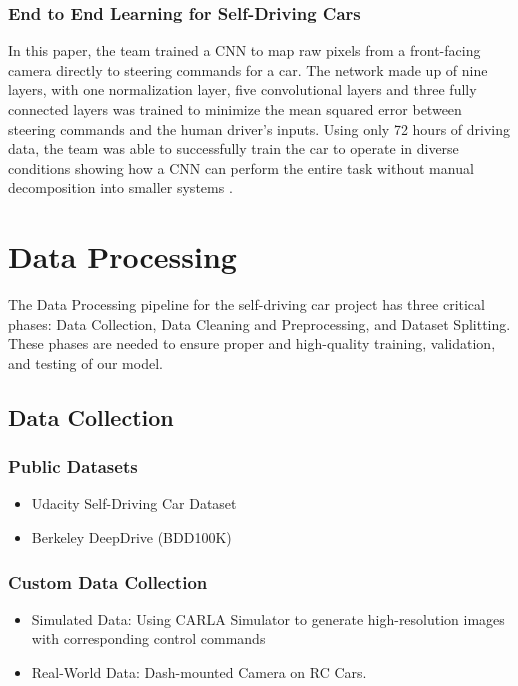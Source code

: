 \documentclass{article} %
\begin{document}
\subsubsection{End to End Learning for Self-Driving Cars \citep{bojarski2016endendlearningselfdriving}}

In this paper, the team trained a CNN to map raw pixels from a front-facing camera directly to steering commands for a car. 
The network made up of nine layers, with one normalization layer, five convolutional layers and three fully connected layers 
was trained to minimize the mean squared error between steering commands and the human driver’s inputs. Using only 
72 hours of driving data, the team was able to successfully train the car to operate in diverse conditions showing 
how a CNN can perform the entire task without manual decomposition into smaller systems \citep{bojarski2016endendlearningselfdriving}. 

\section{Data Processing}
\label{headings}


The Data Processing pipeline for the self-driving car project has three critical phases:
Data Collection, Data Cleaning and Preprocessing, and Dataset Splitting. These phases are
needed to ensure proper and high-quality training, validation, and testing of our model.

\subsection{Data Collection}

\subsubsection{Public Datasets}
\begin{itemize}
  \item Udacity Self-Driving Car Dataset \citep{udacity_self_driving_car_2021}
  \item Berkeley DeepDrive (BDD100K) \citep{bdd100k_2018}
\end{itemize}

\subsubsection{Custom Data Collection}
\begin{itemize}
  \item Simulated Data: Using CARLA Simulator to generate high-resolution images with corresponding control commands \citep{Dosovitskiy17}
  \item Real-World Data: Dash-mounted Camera on RC Cars.
\end{itemize}
\end{document}
